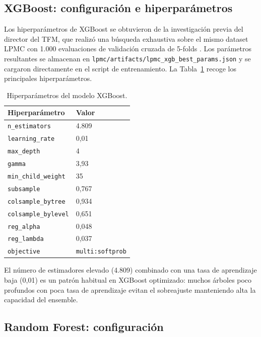 \subsection{XGBoost: configuración e hiperparámetros}

Los hiperparámetros de XGBoost se obtuvieron de la investigación previa del director del TFM, que realizó una búsqueda exhaustiva sobre el mismo dataset LPMC con 1.000 evaluaciones de validación cruzada de 5-folds \cite{MartinBaos2023Thesis,MartinBaos2023TRC}. Los parámetros resultantes se almacenan en \texttt{lpmc/artifacts/lpmc\_xgb\_best\_params.json} y se cargaron directamente en el script de entrenamiento. La Tabla~\ref{tab:xgb_params} recoge los principales hiperparámetros.

\begin{table}[htbp]
  \caption{Hiperparámetros del modelo XGBoost.}
  \label{tab:xgb_params}
  \centering
  \begin{tabular}{ll}
    \toprule
    \textbf{Hiperparámetro} & \textbf{Valor} \\
    \midrule
    \texttt{n\_estimators}      & 4.809 \\
    \texttt{learning\_rate}     & 0,01 \\
    \texttt{max\_depth}         & 4 \\
    \texttt{gamma}              & 3,93 \\
    \texttt{min\_child\_weight} & 35 \\
    \texttt{subsample}          & 0,767 \\
    \texttt{colsample\_bytree}  & 0,934 \\
    \texttt{colsample\_bylevel} & 0,651 \\
    \texttt{reg\_alpha}         & 0,048 \\
    \texttt{reg\_lambda}        & 0,037 \\
    \texttt{objective}          & \texttt{multi:softprob} \\
    \bottomrule
  \end{tabular}
\end{table}

El número de estimadores elevado (4.809) combinado con una tasa de aprendizaje baja (0,01) es un patrón habitual en XGBoost optimizado: muchos árboles poco profundos con poca tasa de aprendizaje evitan el sobreajuste manteniendo alta la capacidad del ensemble.

\subsection{Random Forest: configuración}

